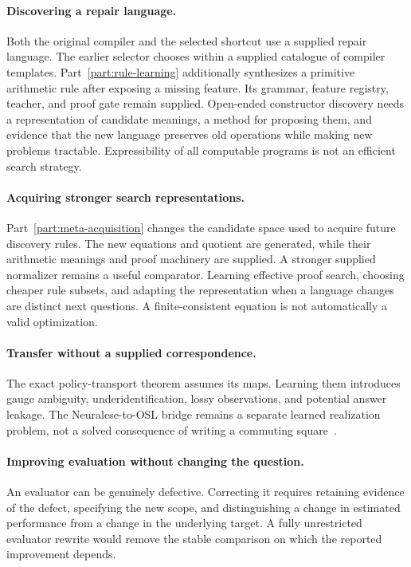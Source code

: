 \documentclass[11pt,letterpaper]{article}
\theoremstyle{plain}
\theoremstyle{definition}
\begin{document}
\paragraph{Discovering a repair language.}
Both the original compiler and the selected shortcut use a supplied repair language. The earlier selector chooses within a supplied catalogue of compiler templates. Part~\ref{part:rule-learning} additionally synthesizes a primitive arithmetic rule after exposing a missing feature. Its grammar, feature registry, teacher, and proof gate remain supplied. Open-ended constructor discovery needs a representation of candidate meanings, a method for proposing them, and evidence that the new language preserves old operations while making new problems tractable. Expressibility of all computable programs is not an efficient search strategy.

\paragraph{Acquiring stronger search representations.}
Part~\ref{part:meta-acquisition} changes the candidate space used to acquire future discovery rules. The new equations and quotient are generated, while their arithmetic meanings and proof machinery are supplied. A stronger supplied normalizer remains a useful comparator. Learning effective proof search, choosing cheaper rule subsets, and adapting the representation when a language changes are distinct next questions. A finite-consistent equation is not automatically a valid optimization.

\paragraph{Transfer without a supplied correspondence.}
The exact policy-transport theorem assumes its maps. Learning them introduces gauge ambiguity, underidentification, lossy observations, and potential answer leakage. The Neuralese-to-OSL bridge remains a separate learned realization problem, not a solved consequence of writing a commuting square~\cite{neuralese}.

\paragraph{Improving evaluation without changing the question.}
An evaluator can be genuinely defective. Correcting it requires retaining evidence of the defect, specifying the new scope, and distinguishing a change in estimated performance from a change in the underlying target. A fully unrestricted evaluator rewrite would remove the stable comparison on which the reported improvement depends.
\end{document}
